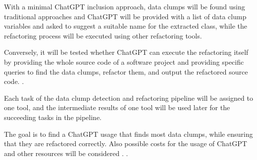With a minimal ChatGPT inclusion approach,  data clumps will be found using traditional approaches and ChatGPT will be provided with a list of data clump variables and asked to suggest a suitable name for the extracted class, while the refactoring process will be executed using other refactoring tools.


Conversely, it will be tested whether ChatGPT can execute the refactoring itself by providing the whole source code of a software project and providing specific queries to find the data clumps, refactor them, and output the refactored source code. \cite{White2023ChatGPTPP}.

Each task of the data clump detection and refactoring pipeline will be assigned to one tool, and the intermediate results of one tool will be used later for the succeeding tasks in the pipeline.

The goal is to find a ChatGPT usage that finds most data clumps, while ensuring that they are refactored correctly. Also possible costs for the usage of ChatGPT and other resources will be considered \cite{xia2023conversation}. \cite{4ef0b456377aafb68884e643779dffb36b8e7cc1}.

